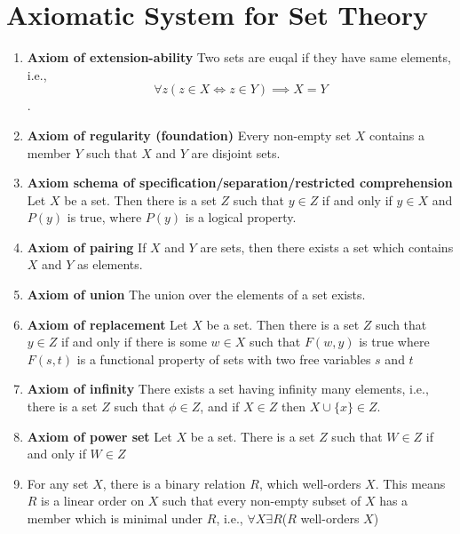 \documentclass[a4paper,english,12pt]{article}
\begin{document}
\section{Axiomatic System for Set Theory}
\begin{defn}
\begin{enumerate}
 \item \textbf{Axiom of extension-ability} Two sets are euqal if they have same elements, i.e.,
 $$\forall z (z\in {X} \Leftrightarrow z\in {Y})\implies {X}={Y}$$.
 \item \textbf{Axiom of regularity (foundation)} Every non-empty set ${X}$ contains a member ${Y}$ such that
 ${X}$ and ${Y}$ are disjoint sets. 
 \item \textbf{Axiom schema of specification/separation/restricted comprehension} Let ${X}$ be a set. Then
there is a set ${Z}$ such that $y \in{Z}$ if and only if $y \in {X}$ and $P(y)$ is true, where $P(y)$ is a logical property. 
 \item \textbf{Axiom of pairing} If ${X}$ and ${Y}$ are sets, then there exists a set which contains ${X}$ and ${Y}$ as elements. 
 \item \textbf{Axiom of union} The union over the elements of a set exists. 
 \item \textbf{Axiom of replacement} Let ${X}$ be a set. Then there is a set ${Z}$ such that $y\in {Z}$ if and only if there is some $w \in {X}$ such that $F(w, y)$ is true where $F(s, t)$ is a functional property of sets with two free variables $s$ and $t$ 
 \item \textbf{Axiom of infinity} There exists a set having infinity many elements, i.e., there is a set ${Z}$ such that $\phi  \in {Z}$, and if ${X} ∈ {Z}$ then ${X} ∪ \{x\} ∈ {Z}$.
\item \textbf{Axiom of power set} Let ${X}$ be a set. There is a set ${Z}$ such that ${W}\in{Z}$ if and only if ${W}\in {Z}$
\item For any set ${X}$, there is a binary relation $R$, which well-orders ${X}$. This means $R$ is a linear order on ${X}$ such that every non-empty subset of ${X}$ has a member which is minimal under $R$, i.e., $\forall {X}\exists R $($R$ well-orders ${X}$)
 \end{enumerate}
\end{defn}
\end{document}
